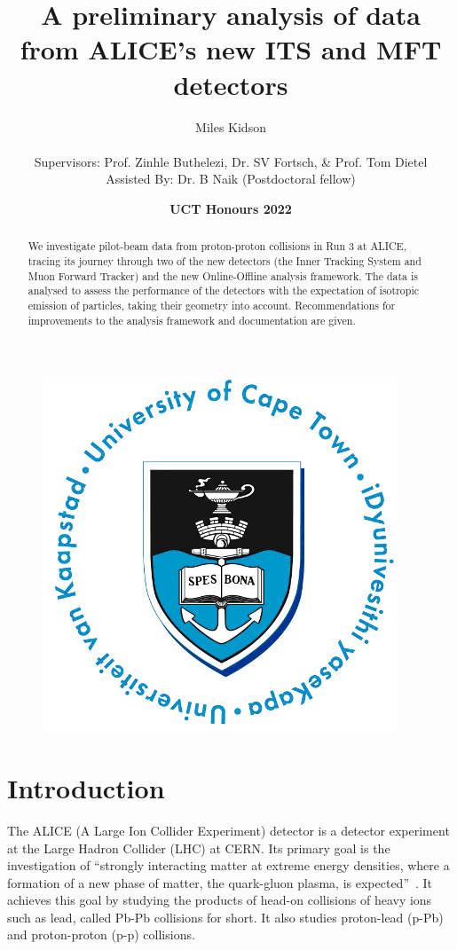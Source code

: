 \documentclass[11pt]{article}
\title{{\Huge A preliminary analysis of data from ALICE's new ITS and MFT detectors}}
\author{{\Large Miles Kidson}\\ \\
Supervisors: Prof. Zinhle Buthelezi, Dr. SV Fortsch, \& Prof. Tom Dietel\\
Assisted By: Dr. B Naik (Postdoctoral fellow)}
\date{\textbf{UCT Honours 2022}}
\numberwithin{equation}{section}
\numberwithin{figure}{section}
\numberwithin{table}{section}
\begin{document}
\maketitle

\begin{figure}[h]
    \begin{center}
        \includegraphics{Figs/UCT.jpg}
    \end{center}
\end{figure}

\begin{abstract}
    \centering
    We investigate pilot-beam data from proton-proton collisions in Run 3 at ALICE, tracing its journey through two of the new detectors (the Inner Tracking System and Muon Forward Tracker) and the new Online-Offline analysis framework. The data is analysed to assess the performance of the detectors with the expectation of isotropic emission of particles, taking their geometry into account. Recommendations for improvements to the analysis framework and documentation are given.
\end{abstract}

\newpage
\tableofcontents

\newpage
\listoffigures

\newpage
{}
\setcounter{page}{1}
\section{Introduction}\label{sec:Introduction}
The ALICE (A Large Ion Collider Experiment) detector is a detector experiment at the Large Hadron Collider (LHC) at CERN. Its primary goal is the investigation of ``strongly interacting matter at extreme energy densities, where a formation of a new phase of matter, the quark-gluon plasma, is expected''~\cite{ALICE_LOI}. It achieves this goal by studying the products of head-on collisions of heavy ions such as lead, called Pb-Pb collisions for short. It also studies proton-lead (p-Pb) and proton-proton (p-p) collisions. 
\end{document}
